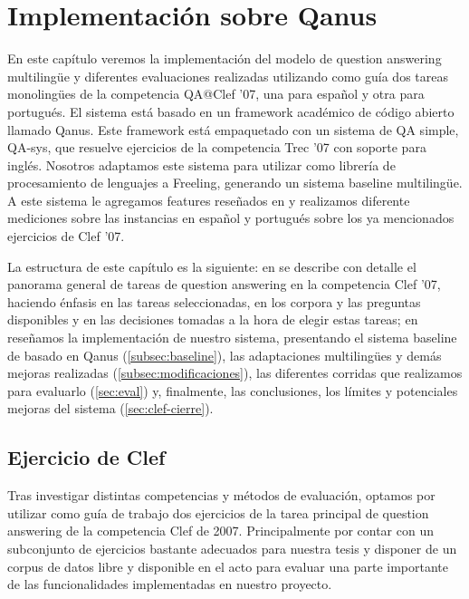 \chapter{Implementación sobre Qanus}
\label{chap:qanus} \label{chap:5}

En este capítulo veremos la implementación del modelo de question answering multilingüe y diferentes evaluaciones realizadas utilizando como guía dos tareas monolingües de la competencia QA@Clef '07, una para español y otra para portugués. El sistema está basado en un framework académico de código abierto llamado Qanus. Este framework está empaquetado con un sistema de QA simple, QA-sys, que resuelve ejercicios de la competencia Trec '07 con soporte para inglés. Nosotros adaptamos este sistema para utilizar como librería de procesamiento de lenguajes a Freeling, generando un sistema baseline multilingüe. A este sistema le agregamos features reseñados en  y realizamos diferente mediciones sobre las instancias en español y portugués sobre los ya mencionados ejercicios de Clef '07.

La estructura de este capítulo es la siguiente: en  se describe con detalle el panorama general de tareas de question answering en la competencia Clef '07, haciendo énfasis en las tareas seleccionadas, en los corpora y las preguntas disponibles y en las decisiones tomadas a la hora de elegir estas tareas; en  reseñamos la implementación de nuestro sistema, presentando el sistema baseline de basado en Qanus (\ref{subsec:baseline}), las adaptaciones multilingües y demás mejoras realizadas (\ref{subsec:modificaciones}), las diferentes corridas que realizamos para evaluarlo (\ref{sec:eval}) y, finalmente, las conclusiones, los límites y potenciales mejoras del sistema (\ref{sec:clef-cierre}).

\section{Ejercicio de Clef}
\label{sec:ejercicio-de-clef}
Tras investigar distintas competencias y métodos de evaluación, optamos por utilizar como guía de trabajo dos ejercicios de la tarea principal de question answering de la competencia Clef de 2007. Principalmente por contar con un subconjunto de ejercicios bastante adecuados para nuestra tesis y disponer de un corpus de datos libre y disponible en el acto para evaluar una parte importante de las funcionalidades implementadas en nuestro proyecto.

